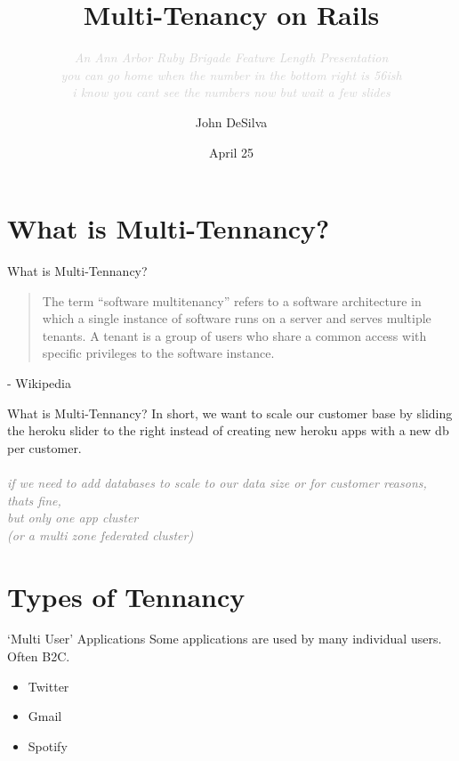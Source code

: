 \documentclass{beamer}
\title{Multi-Tenancy on Rails}
\subtitle{
  \textcolor{lightgray}{
    \textit{
      An Ann Arbor Ruby Brigade Feature Length Presentation \\
      \textcolor{mLightGray}{
        {\scriptsize you can go home when the number in the bottom right is 56ish} \\
        {\tiny i know you cant see the numbers now but wait a few slides} \\
      }
    }
  }
}
\date{April 25}
\author{John DeSilva}
\institute{Revela, Inc.}
\begin{document}
  \maketitle

  \section{What is Multi-Tennancy?}

  \begin{frame}{What is Multi-Tennancy?}
    \begin{quote}
      The term ``software multitenancy'' refers to a software architecture in
      which a single instance of software runs on a server and serves multiple
      tenants. A tenant is a group of users who share a common access with
      specific privileges to the software instance.
    \end{quote}

    - Wikipedia
  \end{frame}

  \begin{frame}{What is Multi-Tennancy?}
    In short, we want to scale our customer base by sliding the heroku slider
    to the right instead of creating new heroku apps with a new db per
    customer. \\
    \vspace{1cm}\\
    \textcolor{gray}{\textit{{\tiny if we need to add databases to scale to our
    data size or for customer reasons,\\
    thats fine,\\
    but only one app cluster\\
    (or a multi zone federated cluster)}}}

  \end{frame}

  \section{Types of Tennancy}

  \begin{frame}{`Multi User' Applications}
    Some applications are used by many individual users. Often B2C.
    \begin{itemize}
      \item Twitter
      \item Gmail
      \item Spotify
    \end{itemize}
  \end{frame}
\end{document}

